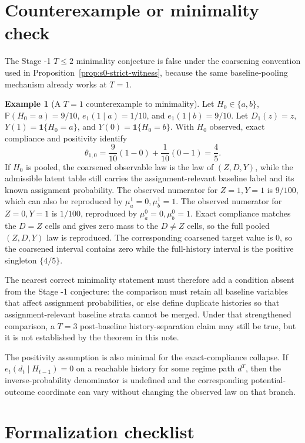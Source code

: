 \documentclass[11pt]{article}
\renewcommand{\Pr}{\mathbb{P}}
\newcommand{\one}{\mathbf{1}}
\theoremstyle{definition}
\newtheorem{example}{Example}
\theoremstyle{plain}
\theoremstyle{remark}
\begin{document}
\section{Counterexample or minimality check}\label{sec:s0-counterexample}
The Stage -1 \(T\le2\) minimality conjecture is false under the coarsening convention used in Proposition~\ref{prop:s0-strict-witness}, because the same baseline-pooling mechanism already works at \(T=1\).

\begin{example}[A \(T=1\) counterexample to minimality]\label{ex:s0-t1-counter}
Let \(H_0\in\{a,b\}\), \(\Pr(H_0=a)=9/10\), \(e_1(1\mid a)=1/10\), and \(e_1(1\mid b)=9/10\).  Let \(D_1(z)=z\), \(Y(1)=\one\{H_0=a\}\), and \(Y(0)=\one\{H_0=b\}\).  With \(H_0\) observed, exact compliance and positivity identify
\[
\theta_{1,0}=\frac{9}{10}(1-0)+\frac{1}{10}(0-1)=\frac45.
\]
If \(H_0\) is pooled, the coarsened observable law is the law of
\((Z,D,Y)\), while the admissible latent table still carries the
assignment-relevant baseline label and its known assignment probability.
The observed numerator for \(Z=1,Y=1\) is \(9/100\), which can also be
reproduced by \(\mu_a^1=0,\mu_b^1=1\).  The observed numerator for
\(Z=0,Y=1\) is \(1/100\), reproduced by \(\mu_a^0=0,\mu_b^0=1\).  Exact
compliance matches the \(D=Z\) cells and gives zero mass to the \(D\ne Z\)
cells, so the full pooled \((Z,D,Y)\) law is reproduced.  The
corresponding coarsened target value is \(0\), so the coarsened interval
contains zero while the full-history interval is the positive singleton
\(\{4/5\}\).
\end{example}

The nearest correct minimality statement must therefore add a condition absent from the Stage -1 conjecture: the comparison must retain all baseline variables that affect assignment probabilities, or else define duplicate histories so that assignment-relevant baseline strata cannot be merged.  Under that strengthened comparison, a \(T=3\) post-baseline history-separation claim may still be true, but it is not established by the theorem in this note.

The positivity assumption is also minimal for the exact-compliance collapse.  If \(e_t(d_t\mid H_{t-1})=0\) on a reachable history for some regime path \(d^T\), then the inverse-probability denominator is undefined and the corresponding potential-outcome coordinate can vary without changing the observed law on that branch.

\section{Formalization checklist}
\end{document}
